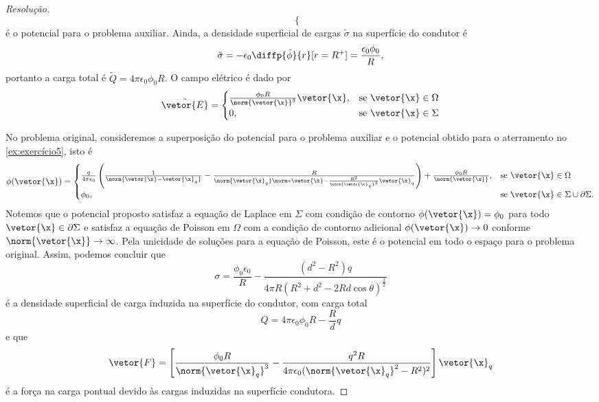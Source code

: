 \begin{proof}[Resolução]
\begin{equation*}
\begin{cases}
        \end{cases}
    \end{equation*}
    é o potencial para o problema auxiliar. Ainda, a densidade superficial de cargas \(\tilde{\sigma}\) na superfície do condutor é
    \begin{equation*}
        \tilde{\sigma} = - \epsilon_0\diffp{\tilde{\phi}}{r}[r=R^+] = \frac{\epsilon_0\phi_0}{R},
    \end{equation*}
    portanto a carga total é \(\tilde{Q} = 4\pi \epsilon_0 \phi_0 R\). O campo elétrico é dado por
    \begin{equation*}
        \tilde{\vetor{E}} = \begin{cases}
            \frac{\phi_0 R}{\norm{\vetor{\x}}^3}\vetor{\x},&\text{se }\vetor{\x} \in \Omega\\
            0,&\text{se }\vetor{\x} \in \Sigma
        \end{cases}
    \end{equation*}

    No problema original, consideremos a superposição do potencial para o problema auxiliar e o potencial obtido para o aterramento no \cref{ex:exercício5}, isto é
    \begin{equation*}
        \phi(\vetor{\x}) = \begin{cases}
            \frac{q}{4\pi \epsilon_0} \left(\frac{1}{\norm{\vetor{\x} - \vetor{\x}_q}} - \frac{R}{\norm{\vetor{\x}_q}\norm*{\vetor{\x} - \frac{R^2}{\norm{\vetor{\x}_q}^2}\vetor{\x}_q}}\right) + \frac{\phi_0 R}{\norm{\vetor{\x}}},&\text{se }\vetor{\x} \in \Omega\\
            \phi_0, &\text{se } \vetor{\x}\in \Sigma \cup \partial \Sigma.
        \end{cases}
    \end{equation*}
    Notemos que o potencial proposto satisfaz a equação de Laplace em \(\Sigma\) com condição de contorno \(\phi(\vetor{\x}) = \phi_0\) para todo \(\vetor{\x} \in \partial \Sigma\) e satisfaz a equação de Poisson em \(\Omega\) com a condição de contorno adicional \(\phi(\vetor{\x}) \to 0\) conforme \(\norm{\vetor{\x}} \to \infty\). Pela unicidade de soluções para a equação de Poisson, este é o potencial em todo o espaço para o problema original. Assim, podemos concluir que
    \begin{equation*}
        \sigma = \frac{\phi_0 \epsilon_0}{R}-\frac{(d^2 - R^2)q}{4\pi R(R^2 + d^2 - 2Rd \cos\theta)^{\frac32}}
    \end{equation*}
    é a densidade superficial de carga induzida na superfície do condutor, com carga total
    \begin{equation*}
        Q = 4\pi \epsilon_0 \phi_0 R - \frac{R}{d}q
    \end{equation*}
    e que
    \begin{equation*}
        \vetor{F} = \left[\frac{\phi_0R}{\norm{\vetor{\x}_q}^3}-\frac{q^2 R}{4\pi \epsilon_0 (\norm{\vetor{\x}_q}^2 - R^2)^2}\right]\vetor{\x}_q
    \end{equation*}
    é a força na carga pontual devido às cargas induzidas na superfície condutora.
\end{proof}
